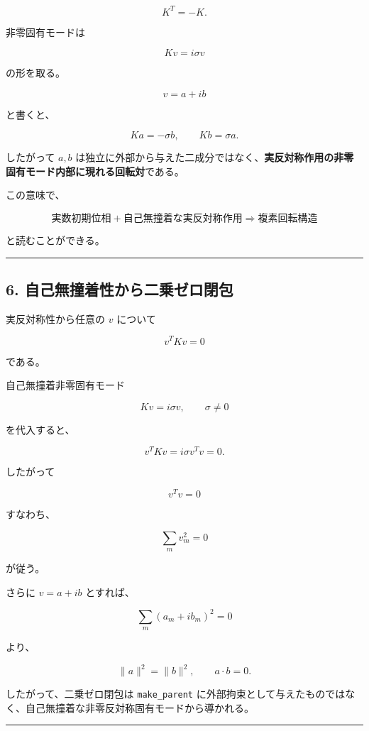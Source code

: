 \documentclass[
  a4paper,
]{ltjsarticle}
\begin{document}
\[
K^T=-K.
\]

非零固有モードは

\[
Kv=i\sigma v
\]

の形を取る。

\[
v=a+ib
\]

と書くと、

\[
Ka=-\sigma b,\qquad
Kb=\sigma a.
\]

したがって \(a,b\)
は独立に外部から与えた二成分ではなく、\textbf{実反対称作用の非零固有モード内部に現れる回転対}である。

この意味で、

\[
\boxed{
\text{実数初期位相}
+\text{自己無撞着な実反対称作用}
\Rightarrow
\text{複素回転構造}
}
\]

と読むことができる。

\begin{center}\rule{0.5\linewidth}{0.5pt}\end{center}

\subsection{6.
自己無撞着性から二乗ゼロ閉包}\label{ux81eaux5df1ux7121ux649eux7740ux6027ux304bux3089ux4e8cux4e57ux30bcux30edux9589ux5305}

実反対称性から任意の \(v\) について

\[
v^T K v=0
\]

である。

自己無撞着非零固有モード

\[
Kv=i\sigma v,\qquad \sigma\neq0
\]

を代入すると、

\[
v^TKv=i\sigma v^Tv=0.
\]

したがって

\[
\boxed{v^Tv=0}
\]

すなわち、

\[
\boxed{\sum_m v_m^2=0}
\]

が従う。

さらに \(v=a+ib\) とすれば、

\[
\sum_m(a_m+ib_m)^2=0
\]

より、

\[
\boxed{\|a\|^2=\|b\|^2},
\qquad
\boxed{a\cdot b=0}.
\]

したがって、二乗ゼロ閉包は \texttt{make\_parent}
に外部拘束として与えたものではなく、自己無撞着な非零反対称固有モードから導かれる。

\begin{center}\rule{0.5\linewidth}{0.5pt}\end{center}
\end{document}
